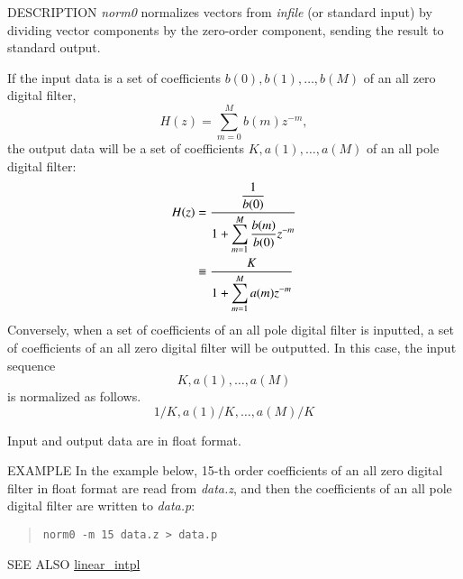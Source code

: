 \begin{synopsis}
\item[norm0] [ --m $M$ ] [ {\em infile} ]
\end{synopsis}

\begin{qsection}{DESCRIPTION}
{\em norm0} normalizes vectors from {\em infile} (or standard input) 
by dividing vector components by the zero-order component, 
sending the result to standard output.

If the input data is a set of coefficients
$b(0), b(1), \dots, b(M)$ of an all zero digital filter, 
\begin{displaymath}
H(z) = \sum_{m=0}^{M} b(m) z^{-m},
\end{displaymath}
the output data will be a set of coefficients
$K, a(1), \dots, a(M)$ of an all pole digital filter:
\begin{align}
H(z) &= \frac{\displaystyle{\frac{1}{b(0)}}}{\displaystyle{1+\sum_{m=1}^{M}\frac{b(m)}{b(0)}z^{-m}}}  \notag \\
     &\equiv \frac{K}{\displaystyle{1+\sum_{m=1}^{M}a(m)z^{-m}}} \notag
\end{align}
Conversely, when a set of coefficients of an all pole digital filter is inputted, a set of coefficients of an all zero digital filter will be outputted. 
In this case, the input sequence
\begin{displaymath}
K, a(1), \dots, a(M)
\end{displaymath}
is normalized as follows.
\begin{displaymath}
1/K, a(1)/K, \dots, a(M)/K
\end{displaymath}

Input and output data are in float format.
\end{qsection}

\begin{options}
\end{options}

\begin{qsection}{EXAMPLE}
In the example below, 15-th order coefficients of an all zero digital filter in float format are read from {\em data.z}, and then the coefficients of an all pole digital filter are written to {\em data.p}:
\begin{quote}
  \verb!norm0 -m 15 data.z > data.p!
\end{quote}
\end{qsection}

\begin{qsection}{SEE ALSO}
\hyperlink{linear_intpl}{linear\_intpl}
\end{qsection}
